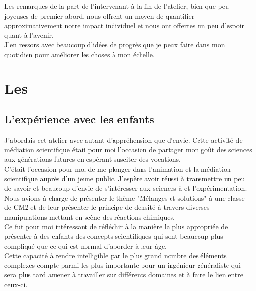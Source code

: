 Les remarques de la part de l'intervenant à la fin de l'atelier, bien que peu joyeuses de premier abord, nous offrent un moyen de quantifier approximativement notre impact individuel et nous ont offertes un peu d'espoir quant à l'avenir.\\

J'en ressors avec beaucoup d'idées de progrès que je peux faire dans mon quotidien pour améliorer les choses à mon échelle.

\section{Les \pd}

\subsection{L'expérience avec les enfants}

J'abordais cet atelier avec autant d'appréhension que d'envie. Cette activité de médiation scientifique était pour moi l'occasion de partager mon goût des sciences aux générations futures en espérant susciter des vocations.\\
C'était l'occasion pour moi de me plonger dans l'animation et la médiation scientifique auprès d'un jeune public. J'espère avoir réussi à transmettre un peu de savoir et beaucoup d'envie de s'intéresser aux sciences à et l'expérimentation.\\

Nous avions à charge de présenter le thème "Mélanges et solutions" à une classe de CM2 et de leur présenter le principe de densité à travers diverses manipulations mettant en scène des réactions chimiques.\\

Ce fut pour moi intéressant de réfléchir à la manière la plus appropriée de présenter à des enfants des concepts scientifiques qui sont beaucoup plus compliqué que ce qui est normal d'aborder à leur âge.\\
Cette capacité à rendre intelligible par le plus grand nombre des éléments complexes compte parmi les plus importante pour un ingénieur généraliste qui sera plus tard amener à travailler sur différents domaines et à faire le lien entre ceux-ci.\\

